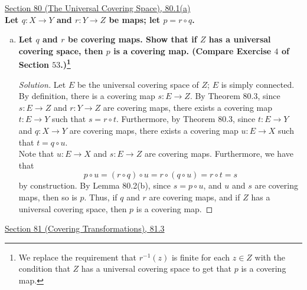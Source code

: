 \documentclass[11pt]{article}
\newenvironment{solution}
  {\renewcommand\qedsymbol{$\blacksquare$}\begin{proof}[Solution]}
  {\end{proof}}
\begin{document}
\newpage

\underline{Section 80 (The Universal Covering Space), 80.1(a)} \\

\textbf{Let $q\colon X \rightarrow Y$ and $r\colon Y \rightarrow Z$ be maps; let $p = r \circ q$.}
\begin{enumerate}[a)]
    \item \textbf{Let $q$ and $r$ be covering maps. Show that if $Z$ has a universal covering space, then $p$ is a covering map. (Compare Exercise $4$ of Section $53$.)\footnote{
    We replace the requirement that $r^{-1}(z)$ is finite for each $z \in Z$ with the condition that $Z$ has a universal covering space to get that $p$ is a covering map.}}
    \begin{solution}
    
    Let $E$ be the universal covering space of $Z$; $E$ is simply connected. By definition, there is a covering map $s \colon E \rightarrow Z$. 
    By Theorem 80.3, since $s \colon E \rightarrow Z$ and $r \colon Y \rightarrow Z$ are covering maps, there exists a covering map $t \colon E \rightarrow Y$ such that $s = r \circ t$. 
    Furthermore, by Theorem 80.3, since $t \colon E \rightarrow Y$ and $q \colon X \rightarrow Y$ are covering maps, there exists a covering map $u\colon E \rightarrow X$ such that $t = q \circ u$. \\

    Note that $u \colon E \rightarrow X$ and $s \colon E \rightarrow Z$ are covering maps. Furthermore, we have that
    \[
        p \circ u = (r \circ q) \circ u = r \circ (q \circ u) = r \circ t = s
    \]
    by construction. By Lemma 80.2(b), since $s = p \circ u$, and $u$ and $s$ are covering maps, then so is $p$. 
    Thus, if $q$ and $r$ are covering maps, and if $Z$ has a universal covering space, then $p$ is a covering map.
    \end{solution}
\end{enumerate}

\newpage

\underline{Section 81 (Covering Transformations), 81.3} \\
\end{document}
